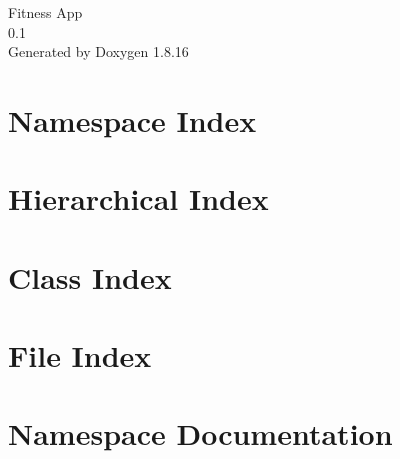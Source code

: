 \let\mypdfximage\pdfximage\def\pdfximage{\immediate\mypdfximage}\documentclass[twoside]{book}
\newcommand{\+}{\discretionary{\mbox{\scriptsize$\hookleftarrow$}}{}{}}
\newcommand{\clearemptydoublepage}{%
  \newpage{\pagestyle{empty}\cleardoublepage}%
}
\begin{document}
\hypersetup{pageanchor=false,
             bookmarksnumbered=true,
             pdfencoding=unicode
            }
\begin{titlepage}
\vspace*{7cm}
\begin{center}%
{\Large Fitness App \\[1ex]\large 0.\+1 }\\
\vspace*{1cm}
{\large Generated by Doxygen 1.8.16}\\
\end{center}
\end{titlepage}
\clearemptydoublepage
{}
\tableofcontents
\clearemptydoublepage
{}
\hypersetup{pageanchor=true}

\chapter{Namespace Index}

\chapter{Hierarchical Index}

\chapter{Class Index}

\chapter{File Index}

\chapter{Namespace Documentation}








\end{document}
